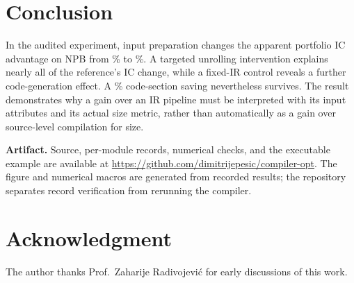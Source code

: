 \documentclass[conference,a4paper]{IEEEtran}
\begin{document}
\section{Conclusion}
In the audited experiment, input preparation changes the apparent
portfolio IC advantage on NPB from \NpbPlainIcGain\% to
\NpbAttrIcGain\%. A targeted unrolling intervention explains nearly
all of the reference's IC change, while a fixed-IR control reveals a
further code-generation effect. A \NpbAttrCodeGain\% code-section
saving nevertheless survives. The result demonstrates why a gain
over an IR pipeline must be interpreted with its input attributes and
its actual size metric, rather than automatically as a gain over
source-level compilation for size.

\textbf{Artifact.} Source, per-module records, numerical checks, and
the executable example are available at
\url{https://github.com/dimitrijepesic/compiler-opt}.
The figure and numerical macros are generated from recorded results;
the repository separates record verification from rerunning the compiler.

\section*{Acknowledgment}
The author thanks Prof.~Zaharije Radivojevi\'c for early discussions of
this work.



\end{document}
